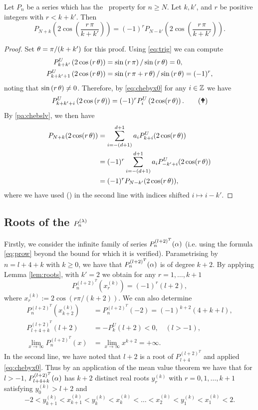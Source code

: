 \begin{lemma}\label{lem:roots} 
Let $P_n$ be a series which has the \ramping\ property for $n\geq N$. Let $k, k'$, and $ r$ be positive integers with $r<k+k'$. Then
\[P_{N+k}\left(2 \cos \left(\frac{r \, \pi}{k+k'}\right)\right)= (-1)^{r} P_{N-k'}\left(2 \cos \left(\frac{r \, \pi}{k+k'}\right)\right).  \]
\end{lemma}
\begin{proof} Set $\theta=\pi/(k+k')$ for this proof. Using \eqref{eq:trig} we can compute
\
\begin{align*}P^U_{k+k'}\left(2 \cos \left(r \, \theta\right)\right)&= \sin\left( r \, \pi \right)/\sin\left( r \, \theta \right)=0,\\
    P^U_{k+k'+1}\left(2 \cos \left(r\, \theta \right)\right)&= \sin\left( r \, \pi +r \, \theta \right)/\sin\left(r\,\theta \right)=(-1)^r,
\end{align*}
noting that $\sin\left(r\,\theta\right)\neq 0$. Therefore, by \eqref{eq:chebyx0} for any $i\in \mathbb{Z} $ we have
\[
P^U_{k+k'+i}\left(2 \cos \left(r\, \theta\right)\right)=(-1)^r P_i^{U}\left(2 \cos (r\, \theta) \right).\tag{\Celtcross}\]
By \ref{pa:chebslv}, we then have
\begin{align*}    P_{N+k}(2 \cos(r\, \theta) )&=\sum_{i=-(d+1)}^{d+1} a_i P^U_{k+i}(2 \cos(r\, \theta) )\\
&=(-1)^r\sum_{i=-(d+1)}^{d+1} a_i  P^U_{-k'+i}(2 \cos(r\, \theta) )\\
&= (-1)^r P_{N-k'}(2 \cos(r\, \theta) ),
\end{align*}
where we have used (\Celtcross) in the second line with indices shifted $i\mapsto i-k'$.
\end{proof}

\subsection{Roots of the $P^{(\lambda)}_n$}\label{ss:roots}

\mdef Firstly, we consider the infinite family of series $P^{(l+2)^T}_{n}(\alpha)$ (i.e. using the formula \eqref{eq:prow} beyond the bound for which it is verified). Parametrising by $n=l+4+k$ with $k\geq 0$, we have that $P^{(l+2)^T}_{n}(\alpha)$ is of degree $k+2$.  By applying Lemma \ref{lem:roots}, with $k'=2$ we obtain for any $r=1,\dots,k+1$ 
\[P^{(l+2)^T}_{n}( x^{(k)}_{r})= (-1)^r(l+2),\]
where $x^{(k)}_{r}:=2\cos(r \pi/(k+2))$. We can also determine
\begin{align*}P^{(l+2)^T}_{n}( x^{(k)}_{k+2})&=P^{(l+2)^T}_{n}( -2)=(-1)^{k+2} (4 + k + l),\\
P^{(l+2)^T}_{l+4+k}( l+2 )&=-P^{U}_{k}(l+2)<0, \quad (l>-1),\\
\lim_{x\to \infty } P^{(l+2)^T}_{n}( x)&=\lim_{x\to \infty } x^{k+2}=+\infty.
\end{align*}
In the second line, we have noted that $l+2$ is a root of $P_{l+4}^{(l+2)^T}$ and applied \eqref{eq:chebyx0}. Thus by an application of the mean value theorem we have that for $l>-1$, $P^{(l+2)^T}_{l+4+k}(\alpha)$ has $k+2$ distinct real roots $y^{(k)}_{r}$ with $r=0,1,\dots,k+1$ satisfying $y_0^{(k)}>l+2$ and 
\[-2<y^{(k)}_{k+1}<x^{(k)}_{k+1}<y^{(k)}_{k}<x^{(k)}_{k}< \dots <x^{(k)}_{2}<y^{(k)}_{1}<x^{(k)}_{1}<2.\]

